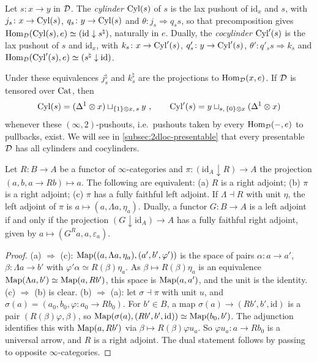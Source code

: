 \begin{defi}[cylinders]
\label{constr:cylinder}
%
Let $s\colon x \to y$ in $\mathcal{D}$. The \emph{cylinder} $\mathrm{Cyl}(s)$ of $s$ is the lax
pushout of $\mathrm{id}_{x}$ and $s$, with
$j_{s}\colon x \to \mathrm{Cyl}(s)$,
$q_{s}\colon y \to \mathrm{Cyl}(s)$
and
$\theta\colon j_{s} \Rightarrow q_{s}s$,
so that precomposition gives
$\operatorname{Hom}_{\mathcal{D}}(\mathrm{Cyl}(s),e) \simeq (\mathrm{id} \downarrow s^{\natural})$,
naturally in $e$. Dually, the \emph{cocylinder} $\mathrm{Cyl}'(s)$ is the lax pushout of
$s$ and $\mathrm{id}_{x}$, with
$k_{s}\colon x \to \mathrm{Cyl}'(s)$,
$q'_{s}\colon y \to \mathrm{Cyl}'(s)$,
$\theta'\colon q'_{s}s \Rightarrow k_{s}$
and
$\operatorname{Hom}_{\mathcal{D}}(\mathrm{Cyl}'(s),e) \simeq (s^{\natural} \downarrow \mathrm{id})$.
\end{defi}

%
Under these equivalences $j_{s}^{\natural}$ and $k_{s}^{\natural}$ are the
projections to $\operatorname{Hom}_{\mathcal{D}}(x,e)$. If $\mathcal{D}$ is tensored over $\mathrm{Cat}$, then
\begin{equation*}
\mathrm{Cyl}(s) = (\Delta^{1} \otimes x) \sqcup_{\{1\} \otimes x,\,s} y \ ,
\qquad \mathrm{Cyl}'(s) = y \sqcup_{s,\,\{0\} \otimes x} (\Delta^{1} \otimes x)
\end{equation*}
whenever these $(\infty,2)$-pushouts, i.e.\ pushouts taken by every
$\operatorname{Hom}_{\mathcal{D}}(-,e)$ to pullbacks, exist. We will see in
\cref{subsec:2dloc-presentable} that every presentable $\mathcal{D}$ has all cylinders
and cocylinders.

\begin{lem}
\label{lem:comma-adjoint}
%
Let $R\colon B \to A$ be a functor of $\infty$-categories and
$\pi\colon (\mathrm{id}_{A} \downarrow R) \to A$
the projection
$(a,b,a \to Rb) \mapsto a$.
The following are equivalent:
(a) $R$ is a right adjoint; (b) $\pi$ is a right adjoint;
(c) $\pi$ has a fully faithful left adjoint.
If $\Lambda \dashv R$ with unit $\eta$, the left adjoint of $\pi$ is
$a \mapsto (a,\Lambda a,\eta_{a})$.
Dually, a functor $G\colon B \to A$ is a left adjoint if and only if the
projection
$(G \downarrow \mathrm{id}_{A}) \to A$
has a fully faithful right adjoint, given by
$a \mapsto (G^{R}a,a,\varepsilon_{a})$.
\end{lem}

\begin{proof}
%
(a) $\Rightarrow$ (c):
$\operatorname{Map}((a,\Lambda a,\eta_{a}),(a',b',\varphi'))$
is the space of pairs
$\alpha\colon a \to a'$,
$\beta\colon \Lambda a \to b'$
with
$\varphi'\alpha \simeq R(\beta)\eta_{a}$.
As
$\beta \mapsto R(\beta)\eta_{a}$
is an equivalence
$\operatorname{Map}(\Lambda a,b') \simeq \operatorname{Map}(a,Rb')$,
this space is $\operatorname{Map}(a,a')$, and the unit is the identity.
(c) $\Rightarrow$ (b) is clear.
(b) $\Rightarrow$ (a): let $\sigma \dashv \pi$ with unit $u$, and
$\sigma(a) = (a_{0},b_{0},\varphi\colon a_{0} \to Rb_{0})$.
For $b' \in B$, a map
$\sigma(a) \to (Rb',b',\mathrm{id})$
is a pair
$(R(\beta)\varphi,\beta)$,
so
$\operatorname{Map}(\sigma(a),(Rb',b',\mathrm{id})) \simeq \operatorname{Map}(b_{0},b')$.
The adjunction identifies this with $\operatorname{Map}(a,Rb')$ via
$\beta \mapsto R(\beta)\varphi u_{a}$.
So
$\varphi u_{a}\colon a \to Rb_{0}$
is a universal arrow, and $R$ is a right adjoint.
The dual statement follows by passing to opposite $\infty$-categories.
\end{proof}

